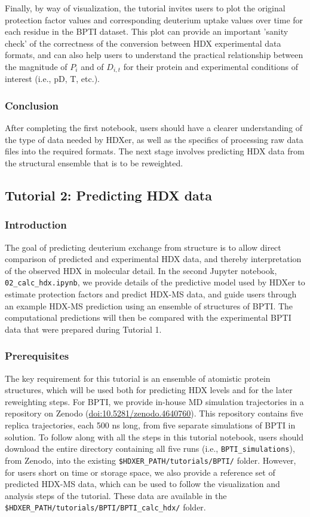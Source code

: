 \documentclass[9pt,tutorial]{livecoms}
\begin{document}
Finally, by way of visualization, the tutorial invites users to plot the original protection factor values and corresponding deuterium uptake values over time for each residue in the BPTI dataset.
This plot can provide an important 'sanity check' of the correctness of the conversion between HDX experimental data formats, and can also help users to understand the practical relationship between the magnitude of $P_i$ and of $D_{i,t}$ for their protein and experimental conditions of interest (i.e., pD, T, etc.).

\subsubsection{Conclusion}
After completing the first notebook, users should have a clearer understanding of the type of data needed by HDXer, as well as the specifics of processing raw data files into the required formats. 
The next stage involves predicting HDX data from the structural ensemble that is to be reweighted.

\subsection{Tutorial 2: Predicting HDX data}\label{tutorial_2}

\subsubsection{Introduction}
The goal of predicting deuterium exchange from structure is to allow direct comparison of predicted and experimental HDX data, and thereby interpretation of the observed HDX in molecular detail.
In the second Jupyter notebook, \texttt{02\_calc\_hdx.ipynb}, we provide details of the predictive model used by HDXer to estimate protection factors and predict HDX-MS data, and guide users through an example HDX-MS prediction using an ensemble of structures of BPTI.
The computational predictions will then be compared with the experimental BPTI data that were prepared during Tutorial 1.

\subsubsection{Prerequisites}
The key requirement for this tutorial is an ensemble of atomistic protein structures, which will be used both for predicting HDX levels and for the later reweighting steps. 
For BPTI, we provide in-house MD simulation trajectories in a repository on Zenodo (\url{doi:10.5281/zenodo.4640760}). 
This repository contains five replica trajectories, each 500 ns long, from five separate simulations of BPTI in solution.
To follow along with all the steps in this tutorial notebook, users should download the entire directory containing all five runs (i.e., \texttt{BPTI\_simulations}), from Zenodo, into the existing \texttt{\$HDXER\_PATH/tutorials/BPTI/} folder.
However, for users short on time or storage space, we also provide a reference set of predicted HDX-MS data, which can be used to follow the visualization and analysis steps of the tutorial. 
These data are available in the \texttt{\$HDXER\_PATH/tutorials/BPTI/BPTI\_calc\_hdx/} folder.
\end{document}
